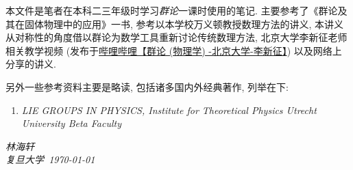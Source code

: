     本文件是笔者在本科二三年级时学习\emph{群论}一课时使用的笔记. 主要参考了《群论及其在固体物理中的应用》\cite{Xu1994}一书, 参考以本学校万义顿教授数理方法的讲义\cite{Wan2024}, 本讲义从对称性的角度借以群论为数学工具重新讨论传统数理方法, 北京大学李新征老师相关教学视频 (发布于\href{https://www.bilibili.com/video/BV1Ux4y177BH?vd_source=d630661fd733349495a9252445d0c4a4}{哔哩哔哩【群论 (物理学) -北京大学-李新征】}) 以及网络上分享的讲义.

    另外一些参考资料主要是略读, 包括诸多国内外经典著作, 列举在下:
    \begin{enumerate}
        \item \textit{LIE GROUPS IN PHYSICS, Institute for Theoretical Physics Utrecht University Beta Faculty} 
    \end{enumerate}

    \vspace{2cm}
    \begin{flushright}
        \textit{林海轩} \\[1em]
        \textit{复旦大学\ \today}
    \end{flushright}